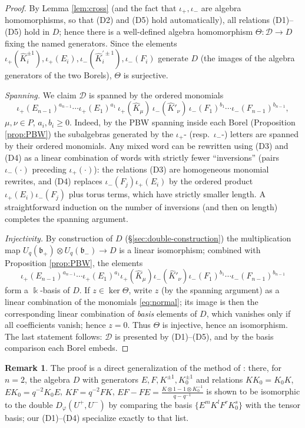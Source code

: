 \documentclass[11pt]{amsart}
\theoremstyle{definition}
\newtheorem{remark}[theorem]{Remark}
\newcommand{\BK}{\Bbbk}
\newcommand{\fb}{\mathfrak{b}}
\newcommand{\iop}{\iota_{+}}
\newcommand{\iom}{\iota_{-}}
\newcommand{\hK}{\hat K}
\begin{document}
\begin{proof}
By Lemma \ref{lem:cross} (and the fact that $\iop,\iom$ are algebra
homomorphisms, so that (D2) and (D5) hold automatically), all relations
(D1)--(D5) hold in $D$; hence there is a well-defined algebra homomorphism
$\Theta:\mathcal{D}\to D$ fixing the named generators. Since the elements
$\iop(\hK_i^{\pm1}),\iop(E_i),\iom(\hK_i^{\prime\pm1}),\iom(F_i)$ generate $D$
(the images of the algebra generators of the two Borels), $\Theta$ is
surjective.

\emph{Spanning.} We claim $\mathcal{D}$ is spanned by the ordered monomials
\begin{equation}\label{eq:normal}
\iop(E_{n-1})^{a_{n-1}}\cdots\iop(E_1)^{a_1}\,\iop(\hK_\mu)\,
\iom(\hK'_\nu)\,\iom(F_1)^{b_1}\cdots\iom(F_{n-1})^{b_{n-1}},
\end{equation}
$\mu,\nu\in P$, $a_i,b_i\ge0$. Indeed, by the PBW spanning inside each Borel
(Proposition \ref{prop:PBW}) the subalgebras generated by the $\iop$- (resp.\
$\iom$-) letters are spanned by their ordered monomials. Any mixed word can be
rewritten using (D3) and (D4) as a linear combination of words with strictly
fewer ``inversions'' (pairs $\iom(\cdot)$ preceding $\iop(\cdot)$): the
relations (D3) are homogeneous monomial rewrites, and (D4) replaces
$\iom(F_j)\iop(E_i)$ by the ordered product $\iop(E_i)\iom(F_j)$ plus torus
terms, which have strictly smaller length. A straightforward induction on the
number of inversions (and then on length) completes the spanning argument.

\emph{Injectivity.} By construction of $D$ (\S\ref{sec:double-construction}) the
multiplication map $U_q(\fb_+)\otimes U_q(\fb_-)\to D$ is a linear isomorphism;
combined with Proposition \ref{prop:PBW}, the elements
\[
\iop(E_{n-1})^{a_{n-1}}\cdots\iop(E_1)^{a_1}\iop(\hK_\mu)\iom(\hK'_\nu)
\iom(F_1)^{b_1}\cdots\iom(F_{n-1})^{b_{n-1}}
\]
form a $\BK$-basis of $D$. If $z\in\ker\Theta$, write $z$ (by the spanning
argument) as a linear combination of the monomials \eqref{eq:normal}; its image
is then the corresponding linear combination of \emph{basis} elements of $D$,
which vanishes only if all coefficients vanish; hence $z=0$. Thus $\Theta$ is
injective, hence an isomorphism. The last statement follows: $\mathcal{D}$ is
presented by (D1)--(D5), and by the basis comparison each Borel embeds.
\end{proof}

\begin{remark}
The proof is a direct generalization of the method of
\cite[Prop.~2.10]{UvA}: there, for $n=2$, the algebra $D$ with generators
$E,F,K^{\pm1},K_0^{\pm1}$ and relations
$KK_0=K_0K$, $EK_0=q^{-2}K_0E$, $KF=q^{-2}FK$,
$EF-FE=\frac{K\otimes1-1\otimes K_0^{-1}}{q-q^{-1}}$ is shown to be isomorphic to
the double $D_\varphi(U^+,U^-)$ by comparing the basis
$\{E^mK^lF^rK_0^s\}$ with the tensor basis; our (D1)--(D4) specialize exactly to
that list.
\end{remark}
\end{document}
